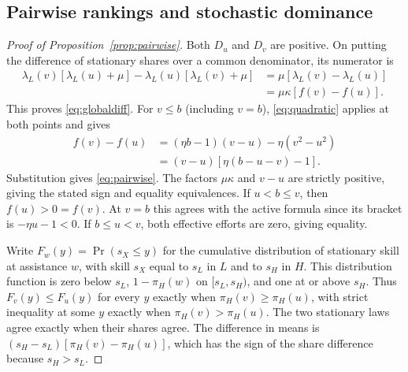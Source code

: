 \documentclass[11pt]{article}
\theoremstyle{definition}
\newcommand{\lam}{\lambda_L}
\newcommand{\share}{\pi_H}
\begin{document}
\subsection{Pairwise rankings and stochastic dominance}\label{app:pairwise}
\begin{proof}[Proof of Proposition~\ref{prop:pairwise}]
Both $D_u$ and $D_v$ are positive. On putting the difference of
stationary shares over a common denominator, its numerator is
\begin{align*}
 \lam(v)[\lam(u)+\mu]-\lam(u)[\lam(v)+\mu]
 &=\mu[\lam(v)-\lam(u)]\\
 &=\mu\kappa[f(v)-f(u)].
\end{align*}
This proves \eqref{eq:globaldiff}. For $v\leq b$ (including $v=b$),
\eqref{eq:quadratic} applies at both points and gives
\begin{align*}
 f(v)-f(u)
 &= (\eta b-1)(v-u)-\eta(v^2-u^2)\\
 &= (v-u)[\eta(b-u-v)-1].
\end{align*}
Substitution gives \eqref{eq:pairwise}. The factors $\mu\kappa$ and
$v-u$ are strictly positive, giving the stated sign and equality
equivalences. If $u<b\leq v$, then $f(u)>0=f(v)$. At $v=b$ this
agrees with the active formula since its bracket is $-\eta u-1<0$.
If $b\leq u<v$, both effective efforts are zero, giving equality.

Write $F_w(y)=\Pr(s_{X}\leq y)$ for the cumulative distribution of
stationary skill at assistance $w$, with skill $s_X$ equal to $s_L$ in
$L$ and to $s_H$ in $H$. This distribution function is zero below $s_L$,
$1-\share(w)$ on $[s_L,s_H)$, and one at or above $s_H$. Thus
$F_v(y)\leq F_u(y)$ for every $y$ exactly when $\share(v)\geq\share(u)$,
with strict inequality at some $y$ exactly when $\share(v)>\share(u)$.
The two stationary laws agree exactly when their shares agree.
The difference in means is
$(s_H-s_L)[\share(v)-\share(u)]$, which has the sign of the share
difference because $s_H>s_L$.
\end{proof}
\end{document}
